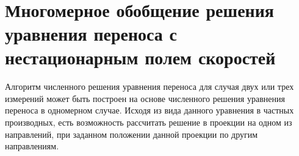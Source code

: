 \documentclass[12pt,a4paper]{article}
\begin{document}
\medskip
\\
\medskip
\\
\medskip
\\

\section{Многомерное обобщение решения уравнения переноса с нестационарным полем скоростей}
Алгоритм численного решения уравнения переноса для случая двух или трех измерений может быть построен на основе численного решения уравнения переноса в одномерном случае.
Исходя из вида данного уравнения в частных производных, есть возможность рассчитать решение в проекции на одном из направлений, при заданном положении данной проекции по другим направлениям.
\end{document}
